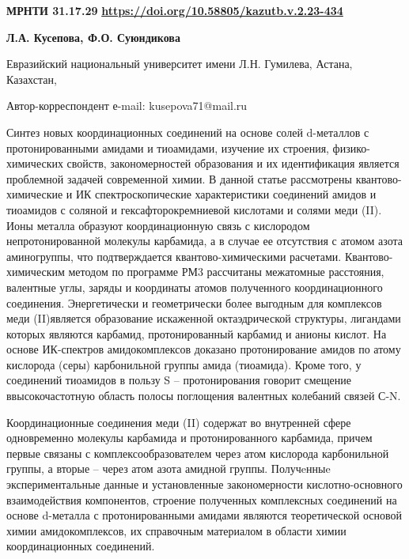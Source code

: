 \newpage
{\bfseries МРНТИ 31.17.29}
\hfill {\bfseries \href{https://doi.org/10.58805/kazutb.v.2.23-434}{https://doi.org/10.58805/kazutb.v.2.23-434}}


\begin{center}
{\bfseries Л.А. Кусепова\envelope, Ф.О. Суюндикова}

Евразийский национальный университет имени Л.Н. Гумилева, Астана,
Казахстан,

\envelope Автор-корреспондент е-mail: kusepova71@mail.ru
\end{center}

Синтез новых координационных соединений на основе солей d-металлов с
протонированными амидами и тиоамидами, изучение их строения,
физико-химических свойств, закономерностей образования и их
идентификация является проблемной задачей современной химии. В данной
статье рассмотрены квантово-химические и ИК спектроскопические
характеристики соединений амидов и тиоамидов с соляной и
гексафторокремниевой кислотами и солями меди (II). Ионы металла образуют
координационную связь с кислородом непротонированной молекулы карбамида,
а в случае ее отсутствия с атомом азота аминогруппы, что подтверждается
квантово-химическими расчетами. Квантово-химическим методом по программе
РМ3 рассчитаны межатомные расстояния, валентные углы, заряды и
координаты атомов полученного координационного соединения. Энергетически
и геометрически более выгодным для комплексов меди (II)является
образование искаженной октаэдрической структуры, лигандами которых
являются карбамид, протонированный карбамид и анионы кислот. На основе
ИК-спектров амидокомплексов доказано протонирование амидов по атому
кислорода (серы) карбонильной группы амида (тиоамида). Кроме того, у
соединений тиоамидов в пользу S -- протонирования говорит смещение
ввысокочастотную область полосы поглощения валентных колебаний связей
С-N.

Координационные соединения меди (II) содержат во внутренней сфере
одновременно молекулы карбамида и протонированного карбамида, причем
первые связаны с комплексообразователем через атом кислорода
карбонильной группы, а вторые -- через атом азота амидной группы.
Получeнныe экспериментальные данные и установленные закономерности
кислотно-основного взаимодействия компонентов, строение полученных
комплексных соединений на основе d-металла с протонированными амидами
являются теоретической основой химии амидокомплексов, их справочным
материалом в области химии координационных соединений.

